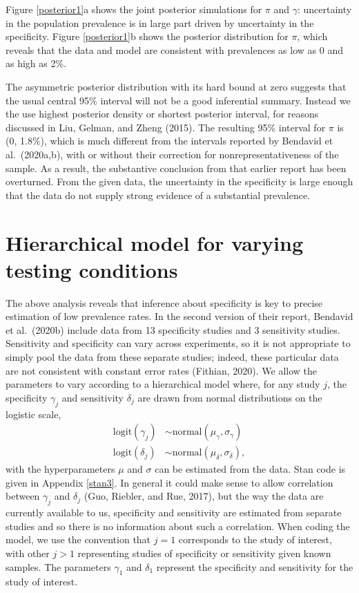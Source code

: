 \documentclass[11pt]{article}
\begin{document}
Figure \ref{posterior1}a shows the joint posterior simulations for
$\pi$ and $\gamma$: uncertainty in the population prevalence is in
large part driven by uncertainty in the specificity.  Figure
\ref{posterior1}b shows the posterior distribution for $\pi$, which
reveals that the data and model are consistent with prevalences as low
as 0 and as high as 2\%.

The asymmetric posterior distribution with its hard bound at zero
suggests that the usual central 95\% interval will not be a good
inferential summary.  Instead we the use highest posterior density or
shortest posterior interval, for reasons discussed in Liu, Gelman, and
Zheng (2015). The resulting 95\% interval for $\pi$ is (0, 1.8\%),
which is much different from the intervals reported by Bendavid et
al.\ (2020a,b), with or without their correction for
nonrepresentativeness of the sample.  As a result, the substantive
conclusion from that earlier report has been overturned. From the
given data, the uncertainty in the specificity is large enough that
the data do not supply strong evidence of a substantial prevalence.

\section{Hierarchical model for varying testing conditions}\label{model2}

The above analysis reveals that inference about specificity is key to
precise estimation of low prevalence rates.  In the second version of
their report, Bendavid et al.\ (2020b) include data from 13
specificity studies and 3 sensitivity studies.  Sensitivity and
specificity can vary across experiments, so it is not appropriate to
simply pool the data from these separate studies; indeed, these
particular data are not consistent with constant error rates (Fithian,
2020). We allow the parameters to vary according to a hierarchical
model where, for any study $j$, the specificity $\gamma_j$ and
sensitivity $\delta_j$ are drawn from normal distributions on the
logistic scale,
%
\begin{align*}
  \mbox{logit}(\gamma_j) & \sim \mbox{normal}(\mu_{\gamma}, \sigma_{\gamma})\\
 \mbox{logit}(\delta_j) & \sim \mbox{normal}(\mu_{\delta}, \sigma_{\delta}),
\end{align*}
%
with the hyperparameters $\mu$ and $\sigma$ can be estimated from the
data.  Stan code is given in Appendix \ref{stan3}.  In general it
could make sense to allow correlation between $\gamma_j$ and
$\delta_j$ (Guo, Riebler, and Rue, 2017), but the way the data are
currently available to us, specificity and sensitivity are estimated
from separate studies and so there is no information about such a
correlation.  When coding the model, we use the convention that $j=1$
corresponds to the study of interest, with other $j > 1$ representing
studies of specificity or sensitivity given known samples.  The
parameters $\gamma_1$ and $\delta_1$ represent the specificity and
sensitivity for the study of interest.
\end{document}
